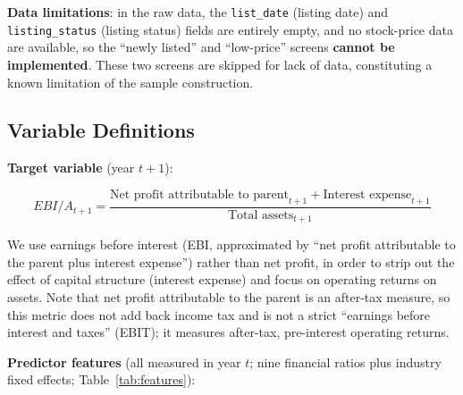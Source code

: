 \documentclass[11pt,a4paper]{article}
\begin{document}
\textbf{Data limitations}: in the raw data, the \texttt{list\_date} (listing date) and \texttt{listing\_status} (listing status) fields are entirely empty, and no stock-price data are available, so the ``newly listed'' and ``low-price'' screens \textbf{cannot be implemented}. These two screens are skipped for lack of data, constituting a known limitation of the sample construction.

\subsection{Variable Definitions}

\textbf{Target variable} (year $t+1$):

\begin{equation}
EBI/A_{t+1} = \frac{\text{Net profit attributable to parent}_{t+1} + \text{Interest expense}_{t+1}}{\text{Total assets}_{t+1}}
\end{equation}

We use earnings before interest (EBI, approximated by ``net profit attributable to the parent plus interest expense'') rather than net profit, in order to strip out the effect of capital structure (interest expense) and focus on operating returns on assets. Note that net profit attributable to the parent is an after-tax measure, so this metric does not add back income tax and is not a strict ``earnings before interest and taxes'' (EBIT); it measures after-tax, pre-interest operating returns.

\textbf{Predictor features} (all measured in year $t$; nine financial ratios plus industry fixed effects; Table~\ref{tab:features}):
\end{document}
